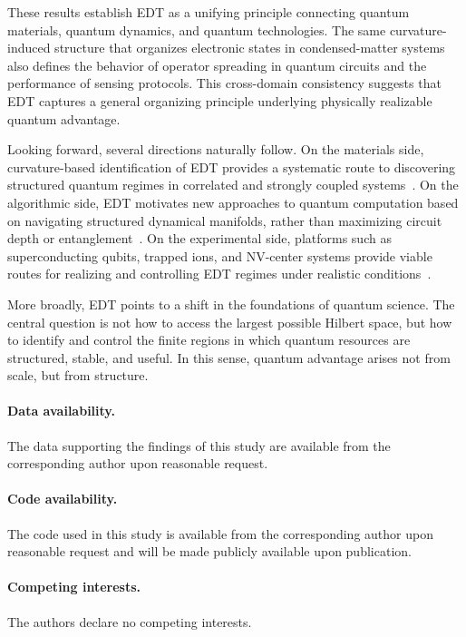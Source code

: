 \documentclass[twocolumn,10pt]{article}
\begin{document}
These results establish EDT as a unifying principle connecting quantum materials, quantum dynamics, and quantum technologies. The same curvature-induced structure that organizes electronic states in condensed-matter systems~\cite{BardeenPines1955,Giustino2017} also defines the behavior of operator spreading in quantum circuits and the performance of sensing protocols. This cross-domain consistency suggests that EDT captures a general organizing principle underlying physically realizable quantum advantage.

Looking forward, several directions naturally follow. On the materials side, curvature-based identification of EDT provides a systematic route to discovering structured quantum regimes in correlated and strongly coupled systems~\cite{Capone2009}. On the algorithmic side, EDT motivates new approaches to quantum computation based on navigating structured dynamical manifolds, rather than maximizing circuit depth or entanglement~\cite{Preskill2018}. On the experimental side, platforms such as superconducting qubits, trapped ions, and NV-center systems provide viable routes for realizing and controlling EDT regimes under realistic conditions~\cite{Degen2017,Arute2019}.

More broadly, EDT points to a shift in the foundations of quantum science. The central question is not how to access the largest possible Hilbert space, but how to identify and control the finite regions in which quantum resources are structured, stable, and useful. In this sense, quantum advantage arises not from scale, but from structure.


\paragraph*{Data availability.}
The data supporting the findings of this study are available from the corresponding author upon reasonable request.

\paragraph*{Code availability.}
The code used in this study is available from the corresponding author upon reasonable request and will be made publicly available upon publication.

\paragraph*{Competing interests.}
The authors declare no competing interests.
\end{document}
